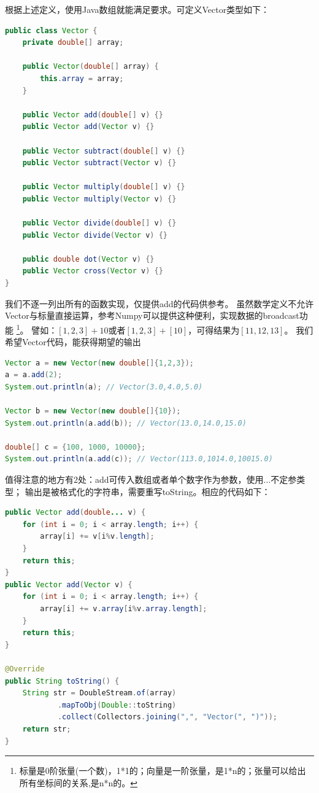 \noindent
根据上述定义，使用Java数组就能满足要求。可定义Vector类型如下：
\begin{lstlisting}[language=Java]
public class Vector {
    private double[] array;

    public Vector(double[] array) {
        this.array = array;
    }

    public Vector add(double[] v) {}
    public Vector add(Vector v) {}

    public Vector subtract(double[] v) {}
    public Vector subtract(Vector v) {}

    public Vector multiply(double[] v) {}
    public Vector multiply(Vector v) {}

    public Vector divide(double[] v) {}
    public Vector divide(Vector v) {}

    public double dot(Vector v) {}
    public Vector cross(Vector v) {}
}
\end{lstlisting}

\noindent
我们不逐一列出所有的函数实现，仅提供add的代码供参考。
虽然数学定义不允许Vector与标量直接运算，参考Numpy可以提供这种便利，实现数据的broadcast功能
\footnote{标量是0阶张量(一个数)，1*1的；向量是一阶张量，是1*n的；张量可以给出所有坐标间的关系,是n*n的。}。
譬如：$[1,2,3] + 10 $或者$[1,2,3] + [10] $，可得结果为$[11,12,13]$。
我们希望Vector代码，能获得期望的输出

\begin{lstlisting}[language=Java]
Vector a = new Vector(new double[]{1,2,3});
a = a.add(2);
System.out.println(a); // Vector(3.0,4.0,5.0)

Vector b = new Vector(new double[]{10});
System.out.println(a.add(b)); // Vector(13.0,14.0,15.0)

double[] c = {100, 1000, 10000};
System.out.println(a.add(c)); // Vector(113.0,1014.0,10015.0)
\end{lstlisting}

\noindent
值得注意的地方有2处：add可传入数组或者单个数字作为参数，使用$\dots$不定参类型；
输出是被格式化的字符串，需要重写toString。相应的代码如下：

\begin{lstlisting}[language=Java]
public Vector add(double... v) {
    for (int i = 0; i < array.length; i++) {
        array[i] += v[i%v.length];
    }
    return this;
}
public Vector add(Vector v) {
    for (int i = 0; i < array.length; i++) {
        array[i] += v.array[i%v.array.length];
    }
    return this;
}

@Override
public String toString() {
    String str = DoubleStream.of(array)
            .mapToObj(Double::toString)
            .collect(Collectors.joining(",", "Vector(", ")"));
    return str;
}
\end{lstlisting}

